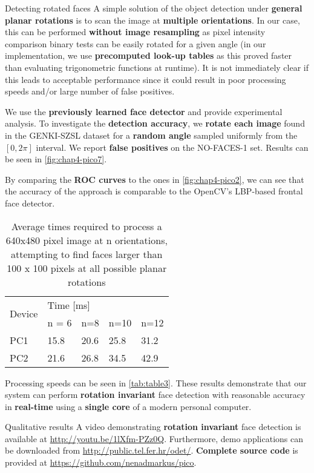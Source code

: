 \begin{compactitem}
\item{Detecting rotated faces}
A simple solution of the object detection under \textbf{general planar rotations} is to scan the
image at \textbf{multiple orientations}. In our case, this can be performed
\textbf{without image resampling} as pixel intensity comparison binary tests can be easily rotated
for a given angle (in our implementation, we use \textbf{precomputed look-up tables} as this
proved faster than evaluating trigonometric functions at runtime).
It is not immediately clear if this leads to acceptable
performance since it could result in poor processing speeds and/or large number of false positives.

We use the \textbf{previously learned face detector} and provide experimental analysis.
To investigate the \textbf{detection accuracy}, we \textbf{rotate each image} found in the GENKI-SZSL dataset
for a \textbf{random angle} sampled uniformly from the $[0, 2\pi]$ interval.
We report \textbf{false positives} on the NO-FACES-1 set. Results can be seen in \autoref{fig:chap4-pico7}.

By comparing the \textbf{ROC curves} to the ones in \autoref{fig:chap4-pico2},
we can see that the accuracy of the approach is comparable to the OpenCV's LBP-based frontal face detector.

\begin{table}[hb]
\begin{tabular}{|l|l|l|l|l|}
\hline
\multirow{2}{*}{Device} & \multicolumn{4}{l|}{Time {[}ms{]}} \\ \cline{2-5}
                        & n = 6   & n=8    & n=10   & n=12   \\ \hline
PC1                     & 15.8    & 20.6   & 25.8   & 31.2   \\ \hline
PC2                     & 21.6    & 26.8   & 34.5   & 42.9   \\ \hline
\end{tabular}
\caption{Average times required to process a 640x480 pixel image at n orientations,
attempting to find faces larger than 100 x 100 pixels at all possible planar rotations}
\label{tab:table3}
\end{table}

Processing speeds can be seen in \autoref{tab:table3}. These results demonstrate
that our system can perform \textbf{rotation invariant} face detection
with reasonable accuracy in \textbf{real-time} using a \textbf{single core} of a modern personal computer.

\item{Qualitative results}
A video demonstrating \textbf{rotation invariant} face detection is available at
\url{http://youtu.be/1lXfm-PZz0Q}.
Furthermore, demo applications can be downloaded from \url{http://public.tel.fer.hr/odet/}.
\textbf{Complete source code} is provided at \url{https://github.com/nenadmarkus/pico}.

\end{compactitem}



